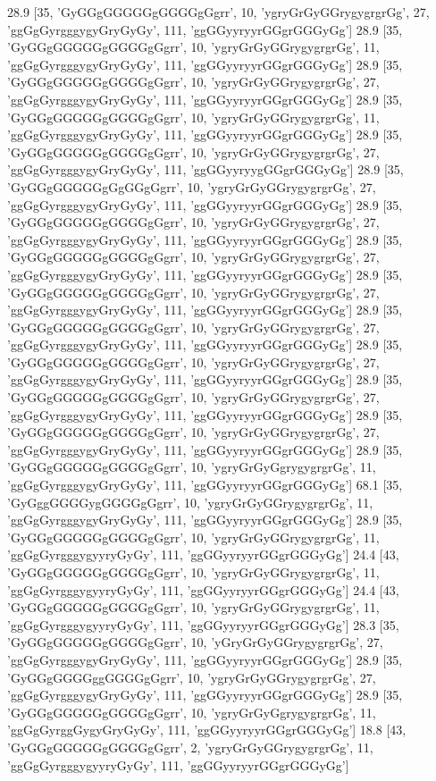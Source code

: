 28.9 [35, 'GyGGgGGGGGgGGGGgGgrr', 10, 'ygryGrGyGGrygygrgrGg', 27, 'ggGgGyrgggygyGryGyGy', 111, 'ggGGyyryyrGGgrGGGyGg']
28.9 [35, 'GyGGgGGGGGgGGGGgGgrr', 10, 'ygryGrGyGGrygygrgrGg', 11, 'ggGgGyrgggygyGryGyGy', 111, 'ggGGyyryyrGGgrGGGyGg']
28.9 [35, 'GyGGgGGGGGgGGGGgGgrr', 10, 'ygryGrGyGGrygygrgrGg', 27, 'ggGgGyrgggygyGryGyGy', 111, 'ggGGyyryyrGGgrGGGyGg']
28.9 [35, 'GyGGgGGGGGgGGGGgGgrr', 10, 'ygryGrGyGGrygygrgrGg', 11, 'ggGgGyrgggygyGryGyGy', 111, 'ggGGyyryyrGGgrGGGyGg']
28.9 [35, 'GyGGgGGGGGgGGGGgGgrr', 10, 'ygryGrGyGGrygygrgrGg', 27, 'ggGgGyrgggygyGryGyGy', 111, 'ggGGyyryygGGgrGGGyGg']
28.9 [35, 'GyGGgGGGGGgGgGGgGgrr', 10, 'ygryGrGyGGrygygrgrGg', 27, 'ggGgGyrgggygyGryGyGy', 111, 'ggGGyyryyrGGgrGGGyGg']
28.9 [35, 'GyGGgGGGGGgGGGGgGgrr', 10, 'ygryGrGyGGrygygrgrGg', 27, 'ggGgGyrgggygyGryGyGy', 111, 'ggGGyyryyrGGgrGGGyGg']
28.9 [35, 'GyGGgGGGGGgGGGGgGgrr', 10, 'ygryGrGyGGrygygrgrGg', 27, 'ggGgGyrgggygyGryGyGy', 111, 'ggGGyyryyrGGgrGGGyGg']
28.9 [35, 'GyGGgGGGGGgGGGGgGgrr', 10, 'ygryGrGyGGrygygrgrGg', 27, 'ggGgGyrgggygyGryGyGy', 111, 'ggGGyyryyrGGgrGGGyGg']
28.9 [35, 'GyGGgGGGGGgGGGGgGgrr', 10, 'ygryGrGyGGrygygrgrGg', 27, 'ggGgGyrgggygyGryGyGy', 111, 'ggGGyyryyrGGgrGGGyGg']
28.9 [35, 'GyGGgGGGGGgGGGGgGgrr', 10, 'ygryGrGyGGrygygrgrGg', 27, 'ggGgGyrgggygyGryGyGy', 111, 'ggGGyyryyrGGgrGGGyGg']
28.9 [35, 'GyGGgGGGGGgGGGGgGgrr', 10, 'ygryGrGyGGrygygrgrGg', 27, 'ggGgGyrgggygyGryGyGy', 111, 'ggGGyyryyrGGgrGGGyGg']
28.9 [35, 'GyGGgGGGGGgGGGGgGgrr', 10, 'ygryGrGyGGrygygrgrGg', 27, 'ggGgGyrgggygyGryGyGy', 111, 'ggGGyyryyrGGgrGGGyGg']
28.9 [35, 'GyGGgGGGGGgGGGGgGgrr', 10, 'ygryGrGyGgrygygrgrGg', 11, 'ggGgGyrgggygyGryGyGy', 111, 'ggGGyyryyrGGgrGGGyGg']
68.1 [35, 'GyGggGGGGygGGGGgGgrr', 10, 'ygryGrGyGGrygygrgrGg', 11, 'ggGgGyrgggygyGryGyGy', 111, 'ggGGyyryyrGGgrGGGyGg']
28.9 [35, 'GyGGgGGGGGgGGGGgGgrr', 10, 'ygryGrGyGGrygygrgrGg', 11, 'ggGgGyrgggygyyryGyGy', 111, 'ggGGyyryyrGGgrGGGyGg']
24.4 [43, 'GyGGgGGGGGgGGGGgGgrr', 10, 'ygryGrGyGGrygygrgrGg', 11, 'ggGgGyrgggygyyryGyGy', 111, 'ggGGyyryyrGGgrGGGyGg']
24.4 [43, 'GyGGgGGGGGgGGGGgGgrr', 10, 'ygryGrGyGGrygygrgrGg', 11, 'ggGgGyrgggygyyryGyGy', 111, 'ggGGyyryyrGGgrGGGyGg']
28.3 [35, 'GyGGgGGGGGgGGGGgGgrr', 10, 'yGryGrGyGGrygygrgrGg', 27, 'ggGgGyrgggygyGryGyGy', 111, 'ggGGyyryyrGGgrGGGyGg']
28.9 [35, 'GyGGgGGGGggGGGGgGgrr', 10, 'ygryGrGyGGrygygrgrGg', 27, 'ggGgGyrgggygyGryGyGy', 111, 'ggGGyyryyrGGgrGGGyGg']
28.9 [35, 'GyGGgGGGGGgGGGGgGgrr', 10, 'ygryGrGyGgrygygrgrGg', 11, 'ggGgGyrggGygyGryGyGy', 111, 'ggGGyyryyrGGgrGGGyGg']
18.8 [43, 'GyGGgGGGGGgGGGGgGgrr', 2, 'ygryGrGyGGrygygrgrGg', 11, 'ggGgGyrgggygyyryGyGy', 111, 'ggGGyyryyrGGgrGGGyGg']
